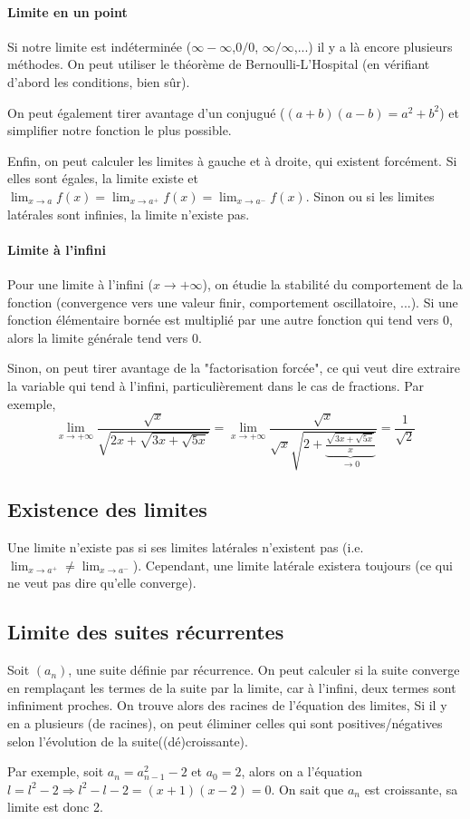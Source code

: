 \documentclass[10pt,a4paper]{book}
\begin{document}
\paragraph{Limite en un point} 
Si notre limite est indéterminée ($\infty -\infty$,$0/0$, $\infty/\infty$,...) il y a là encore plusieurs méthodes. On peut utiliser le théorème de Bernoulli-L'Hospital (en vérifiant d'abord les conditions, bien sûr).\par 
On peut également tirer avantage d'un conjugué ($(a+b)(a-b)=a^2+b^2$) et simplifier notre fonction le plus possible.\par 
Enfin, on peut calculer les limites à gauche et à droite, qui existent forcément. Si elles sont égales, la limite existe et $\lim_{x\to a}f(x) = \lim_{x\to a^+}f(x) = \lim_{x\to a^-}f(x)$. Sinon ou si les limites latérales sont infinies, la limite n'existe pas.
\paragraph{Limite à l'infini}
Pour une limite à l'infini ($x\to +\infty$), on étudie la stabilité du comportement de la fonction (convergence vers une valeur finir, comportement oscillatoire, ...). Si une fonction élémentaire bornée est multiplié par une autre fonction qui tend vers 0, alors la limite générale tend vers 0.\par 
Sinon, on peut tirer avantage de la "factorisation forcée", ce qui veut dire extraire la variable qui tend à l'infini, particulièrement dans le cas de fractions. Par exemple, 
\[\lim_{x\to +\infty}\frac{\sqrt{x}}{\sqrt{2x+\sqrt{3x+\sqrt{5x}}}} = 
\lim_{x\to +\infty}\frac{\sqrt{x}}{\sqrt{x}\sqrt{2+\underbrace{\frac{\sqrt{3x+\sqrt{5x}}}{x}}_{\to 0}}}= \frac{1}{\sqrt{2}}\]

\subsection{Existence des limites}
Une limite n'existe pas si ses limites latérales n'existent pas (i.e. $\lim_{x\to a^+}\neq\lim_{x\to a^-}$). Cependant, une limite latérale existera toujours (ce qui ne veut pas dire qu'elle converge).

\subsection{Limite des suites récurrentes}
Soit $(a_n)$, une suite définie par récurrence. On peut calculer si la suite converge en remplaçant les termes de la suite par la limite, car à l'infini, deux termes sont infiniment proches. On trouve alors des racines de l'équation des limites, Si il y en a plusieurs (de racines), on peut éliminer celles qui sont positives/négatives selon l'évolution de la suite((dé)croissante).\par 
Par exemple, soit $a_n=a_{n-1}^2-2$ et $a_0=2$, alors on a l'équation $l=l^2-2\Rightarrow l^2-l-2=(x+1)(x-2)=0$. On sait que $a_n$ est croissante, sa limite est donc 2.
\end{document}
